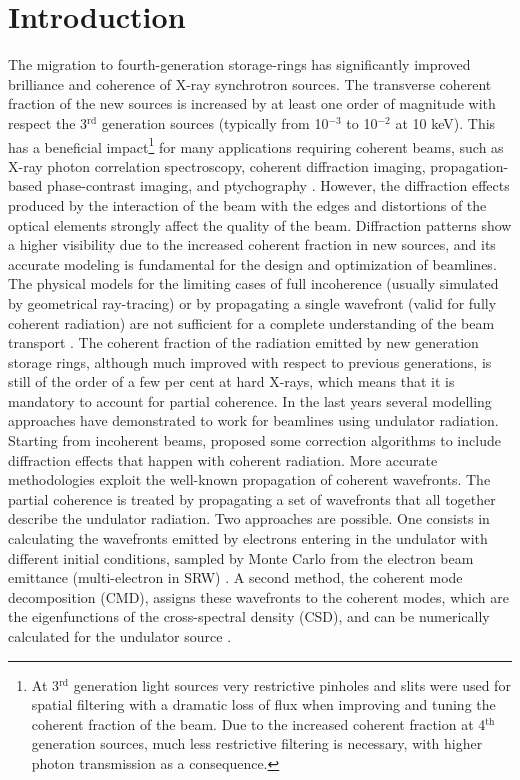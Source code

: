 \documentclass{iucr}              %
\begin{document}
\section{Introduction}
\label{sec:introduction}

The migration to fourth-generation storage-rings has significantly improved brilliance and coherence of X-ray synchrotron sources. The transverse coherent fraction of the new sources is increased by at least one order of magnitude with respect the 3$^{\text{rd}}$ generation sources (typically from 10$^{-3}$ to 10$^{-2}$ at 10 keV). This has a beneficial impact\footnote{At 3$^{\text{rd}}$ generation light sources very restrictive pinholes and slits were used for spatial filtering with a dramatic loss of flux when improving and tuning the coherent fraction of the beam. Due to the increased coherent fraction at 4$^{\text{th}}$ generation sources, much less restrictive filtering is necessary, with higher photon transmission as a consequence.} for many applications requiring coherent beams, such as X-ray photon correlation spectroscopy, coherent diffraction imaging, propagation-based phase-contrast imaging, and ptychography \cite{paganin_book}.
However, the diffraction effects produced by the interaction of the beam with the edges and distortions of the optical elements strongly affect the quality of the beam. Diffraction patterns show a higher visibility due to the increased coherent fraction in new sources, and its accurate modeling is fundamental for the design and optimization of beamlines. The physical models for the limiting cases of full incoherence (usually simulated by geometrical ray-tracing) or by propagating a single wavefront (valid for fully coherent radiation) are not sufficient for a complete understanding of the beam transport \cite{hierarchical}. The coherent fraction of the radiation emitted by new generation storage rings, although much improved with respect to previous generations, is still of the order of a few per cent at hard X-rays, which means that it is mandatory to account for partial coherence. In the last years several modelling approaches have demonstrated to work for beamlines using undulator radiation. Starting from incoherent beams,  proposed some correction algorithms to include diffraction effects that happen with coherent radiation. More accurate methodologies exploit the well-known propagation of coherent wavefronts. The partial coherence is treated by propagating a set of wavefronts that all together describe the undulator radiation. Two approaches are possible. One consists in calculating the wavefronts emitted by electrons entering in the undulator with different initial conditions, sampled by Monte Carlo from the electron beam emittance (multi-electron in SRW) \cite{codeSRW_ME}. A second method, the coherent mode decomposition (CMD), assigns these wavefronts to the coherent modes, which are the eigenfunctions of the cross-spectral density (CSD), and can be numerically calculated for the undulator source \cite{glass2017}.  
 
\end{document}
